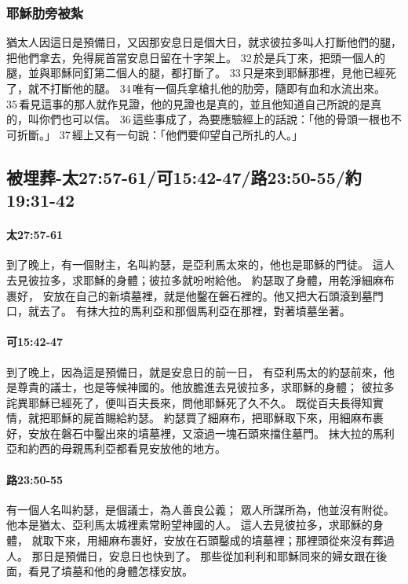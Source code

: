 \subsubsection{耶穌肋旁被紮}
猶太人因這日是預備日，又因那安息日是個大日，就求彼拉多叫人打斷他們的腿，把他們拿去，免得屍首當安息日留在十字架上。 32 於是兵丁來，把頭一個人的腿，並與耶穌同釘第二個人的腿，都打斷了。 33 只是來到耶穌那裡，見他已經死了，就不打斷他的腿。 34 唯有一個兵拿槍扎他的肋旁，隨即有血和水流出來。 35 看見這事的那人就作見證，他的見證也是真的，並且他知道自己所說的是真的，叫你們也可以信。 36 這些事成了，為要應驗經上的話說：「他的骨頭一根也不可折斷。」 37 經上又有一句說：「他們要仰望自己所扎的人。」



\subsection{被埋葬-太27:57-61/可15:42-47/路23:50-55/約19:31-42}
\paragraph{太27:57-61}
到了晚上，有一個財主，名叫約瑟，是亞利馬太來的，他也是耶穌的門徒。
這人去見彼拉多，求耶穌的身體；彼拉多就吩咐給他。
約瑟取了身體，用乾淨細麻布裹好，
安放在自己的新墳墓裡，就是他鑿在磐石裡的。他又把大石頭滾到墓門口，就去了。
有抹大拉的馬利亞和那個馬利亞在那裡，對著墳墓坐著。

\paragraph{可15:42-47}
到了晚上，因為這是預備日，就是安息日的前一日，
有亞利馬太的約瑟前來，他是尊貴的議士，也是等候神國的。他放膽進去見彼拉多，求耶穌的身體；
彼拉多詫異耶穌已經死了，便叫百夫長來，問他耶穌死了久不久。
既從百夫長得知實情，就把耶穌的屍首賜給約瑟。
約瑟買了細麻布，把耶穌取下來，用細麻布裹好，安放在磐石中鑿出來的墳墓裡，又滾過一塊石頭來擋住墓門。
抹大拉的馬利亞和約西的母親馬利亞都看見安放他的地方。

\paragraph{路23:50-55}

有一個人名叫約瑟，是個議士，為人善良公義；
眾人所謀所為，他並沒有附從。他本是猶太、亞利馬太城裡素常盼望神國的人。
這人去見彼拉多，求耶穌的身體，
就取下來，用細麻布裹好，安放在石頭鑿成的墳墓裡；那裡頭從來沒有葬過人。
那日是預備日，安息日也快到了。
那些從加利利和耶穌同來的婦女跟在後面，看見了墳墓和他的身體怎樣安放。

